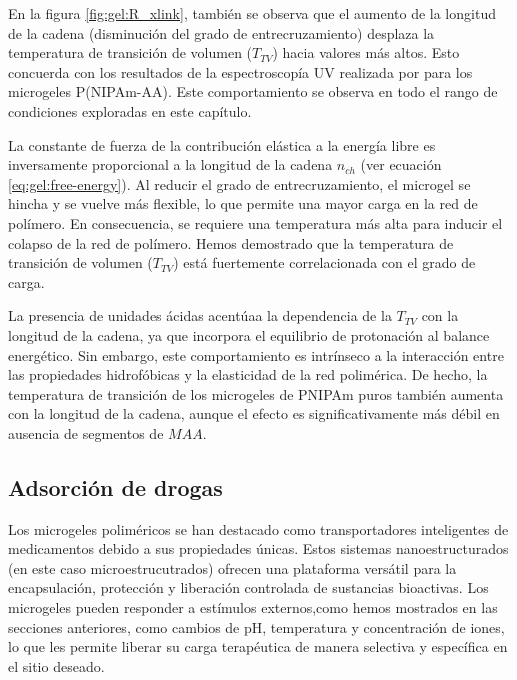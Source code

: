 En la figura \ref{fig:gel:R_xlink}, tambi\'en se observa que el aumento de la longitud de la cadena (disminuci\'on del grado de entrecruzamiento) desplaza la temperatura de transici\'on de volumen ($T_{TV}$) hacia valores m\'as altos. Esto concuerda con los resultados de la espectroscopía UV realizada por \citet{Lee2008} para los microgeles P(NIPAm-AA). Este comportamiento se observa en todo el rango de condiciones exploradas en este cap\'itulo.

La constante de fuerza de la contribuci\'on el\'astica a la energ\'ia libre es inversamente proporcional a la longitud de la cadena $n_{ch}$ (ver ecuaci\'on \ref{eq:gel:free-energy}). Al reducir el grado de entrecruzamiento, el microgel se hincha y se vuelve m\'as flexible, lo que permite una mayor carga en la red de pol\'imero. En consecuencia, se requiere una temperatura m\'as alta para inducir el colapso de la red de pol\'imero. Hemos demostrado que la temperatura de transici\'on de volumen ($T_{TV}$) est\'a fuertemente correlacionada con el grado de carga.

La presencia de unidades \'acidas acent\'uaa la dependencia de la $T_{TV}$ con la longitud de la cadena, ya que incorpora el equilibrio de protonaci\'on al balance energ\'etico. Sin embargo, este comportamiento es intr\'inseco a la interacci\'on entre las propiedades hidrof\'obicas y la elasticidad de la red polim\'erica. De hecho, la temperatura de transici\'on de los microgeles de PNIPAm puros tambi\'en aumenta con la longitud de la cadena, aunque el efecto es significativamente m\'as d\'ebil en ausencia de segmentos de $MAA$.



\subsection{Adsorci\'on de drogas}\label{sec:gel:ads-drogas}


Los microgeles polim\'ericos se han destacado como transportadores inteligentes de medicamentos debido a sus propiedades \'unicas. Estos sistemas nanoestructurados (en este caso microestrucutrados) ofrecen una plataforma vers\'atil para la encapsulaci\'on, protecci\'on y liberaci\'on controlada de sustancias bioactivas. Los microgeles pueden responder a est\'imulos externos,como hemos mostrados en las secciones anteriores,  como cambios de pH, temperatura y concentraci\'on de iones, lo que les permite liberar su carga terap\'eutica de manera selectiva y espec\'ifica en el sitio deseado. 

